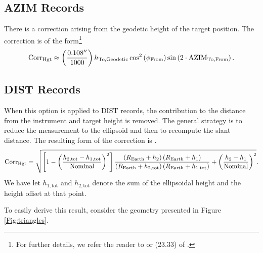 \subsection{AZIM Records}
There is a correction arising from the geodetic height of the target position.  The correction is of the form\footnote{For further details, we refer the reader to \cite{Burkholder97} or (23.33) of \cite{ghilani}.}
\begin{equation}
\text{Corr}_{\text{Hgt}}\approx\left(\frac{0.108''}{1000}\right)h_{\text{To,Geodetic}}\cos^2\left(\phi_{\text{From}}\right)\sin\left(2\cdot\text{AZIM}_{\text{To,From}}\right).
\end{equation}

\subsection{DIST Records} \label{subsection:DIST_HeightCorrection}
When this option is applied to DIST records, the contribution to the distance from the instrument and target height is removed.  The general strategy is to reduce the measurement to the ellipsoid and then to recompute the slant distance.  The resulting form of the correction is \cite{Ghilani_dist_reduced}.
\begin{equation}\label{eq:dist_hgt}
\text{Corr}_{\text{Hgt}}=\sqrt{\left[1-\left(\frac{h_{2,\text{tot}}-h_{1,\text{tot}}}{\text{Nominal}}\right)^2\right]\frac{\left(R_{\text{Earth}}+h_2\right)\left(R_{\text{Earth}}+h_1\right)}{\left(R_{\text{Earth}}+h_{2,\text{tot}}\right)\left(R_{\text{Earth}}+h_{1,\text{tot}}\right)}+\left(\frac{h_2-h_1}{\text{Nominal}}\right)^2}.
\end{equation}
We have let $h_{1,\text{tot}}$ and $h_{2,\text{tot}}$ denote the sum of the ellipsoidal height and the height offset at that point.

To easily derive this result, consider the geometry presented in Figure \ref{Fig:triangles}.

